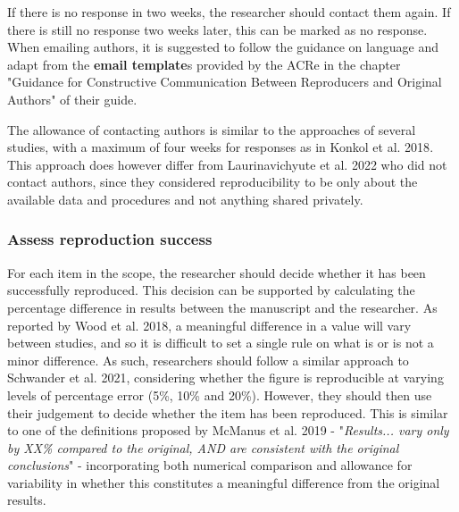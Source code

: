 If there is no response in two weeks, the researcher should contact them again. If there is still no response two weeks later, this can be marked as no response. When emailing authors, it is suggested to follow the guidance on language and adapt from the \textbf{email template}s provided by the ACRe in the chapter "Guidance for Constructive Communication Between Reproducers and Original Authors" of their guide.\autocite{berkeley_initiative_for_transparency_in_the_social_sciences_guide_2022}

The allowance of contacting authors is similar to the approaches of several studies,\autocite{krafczyk_learning_2021,wood_push_2018,berkeley_initiative_for_transparency_in_the_social_sciences_guide_2022,hardwicke_analytic_2021,konkol_computational_2019} with a maximum of four weeks for responses as in Konkol et al. 2018\autocite{konkol_computational_2019}. This approach does however differ from Laurinavichyute et al. 2022\autocite{laurinavichyute_share_2022} who did not contact authors, since they considered reproducibility to be only about the available data and procedures and not anything shared privately.\autocite{laurinavichyute_share_2022}

\subsubsection{Assess reproduction success}
\timeyes

For each item in the scope, the researcher should decide whether it has been successfully reproduced. This decision can be supported by calculating the percentage difference in results between the manuscript and the researcher. As reported by Wood et al. 2018,\autocite{wood_push_2018, wood_replication_2018} a meaningful difference in a value will vary between studies, and so it is difficult to set a single rule on what is or is not a minor difference. As such, researchers should follow a similar approach to Schwander et al. 2021,\autocite{schwander_replication_2021} considering whether the figure is reproducible at varying levels of percentage error (5\%, 10\% and 20\%). However, they should then use their judgement to decide whether the item has been reproduced. This is similar to one of the definitions proposed by McManus et al. 2019\autocite{mcmanus_can_2019} - "\textit{Results... vary only by XX\% compared to the original, AND are consistent with the original conclusions}" - incorporating both numerical comparison and allowance for variability in whether this constitutes a meaningful difference from the original results.

